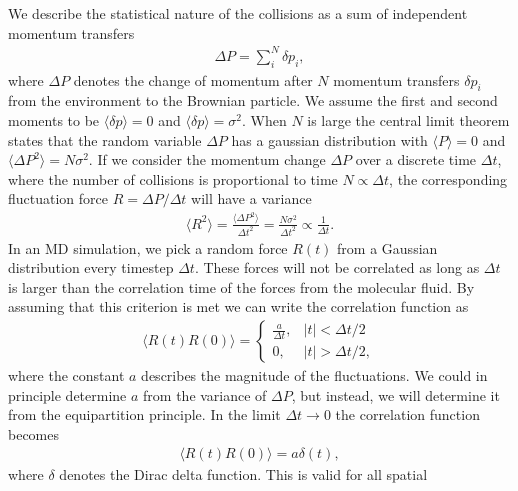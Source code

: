We describe the statistical nature of the collisions as a sum of
independent momentum transfers
\begin{align*}
  \Delta P = \sum_i^N \delta p_i,
\end{align*}
where $\Delta P$ denotes the change of momentum after $N$ momentum transfers
$\delta p_i$ from the environment to the Brownian particle. We assume the first
and second moments to be $\langle \delta p \rangle = 0$ and  $\langle \delta p \rangle
= \sigma^2$. When $N$ is large the central limit theorem states that the random
variable $\Delta P$ has a gaussian distribution with  $\langle P \rangle = 0$
and $\langle \Delta P^2 \rangle = N\sigma^2$. If we consider the momentum change
$\Delta P$ over a discrete time $\Delta t$, where the number of collisions is
proportional to time $N \propto \Delta t$, the corresponding fluctuation force
$R = \Delta P / \Delta t$ will have a variance 
\begin{align*}
  \langle R^2 \rangle = \frac{\langle \Delta P^2 \rangle}{\Delta t^2} = \frac{N \sigma^2}{\Delta t^2}  \propto \frac{1}{\Delta t}.
\end{align*}
In an \acrshort{MD} simulation, we pick a random force $R(t)$ from a Gaussian
distribution every timestep $\Delta t$. These forces will not be correlated as
long as $\Delta t$ is larger than the correlation time of the forces from the molecular fluid. By assuming that this criterion is met we can write the correlation function as 
\begin{align}
  \langle R(t) R(0) \rangle = 
  \begin{cases}
    \frac{a}{\Delta t}, & |t| < \Delta t/2 \\
    0, & |t| > \Delta t/2,
    \label{eq:disc_corr}
  \end{cases}
\end{align}
where the constant $a$ describes the magnitude of the fluctuations. We could in principle determine $a$ from the variance of $\Delta P$, but instead, we will determine it from the equipartition principle. In the limit $\Delta t \to 0$ the correlation function becomes
\begin{align}
  \langle R(t)R(0) \rangle = a \delta(t),
  \label{eq:F_corr}
\end{align}
where $\delta$ denotes the Dirac delta function. This is valid for all spatial

